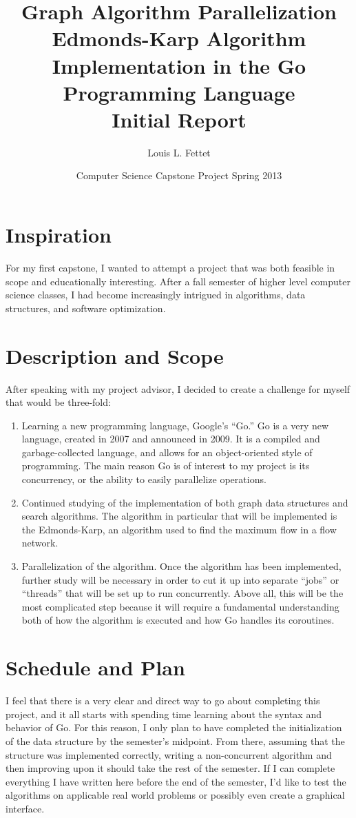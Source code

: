 \documentclass[12pt]{article}
\title{\textbf{Graph Algorithm Parallelization}\\ 
Edmonds-Karp Algorithm Implementation 
in the Go Programming Language\\
Initial Report}
\date{Computer Science Capstone Project Spring 2013}
\author{Louis L. Fettet}
\begin{document}
\maketitle
\section{Inspiration}
For my first capstone, I wanted to attempt a project that was both feasible in scope and educationally interesting.  After a fall semester of higher level computer science classes, I had become increasingly intrigued in algorithms, data structures, and software optimization. 
\section{Description and Scope}
After speaking with my project advisor, I decided to create a challenge for myself that would be three-fold:
	\begin{enumerate}
		\item Learning a new programming language, Google's “Go.” Go is a very new language, created in 2007 and announced in 2009.  It is a compiled and garbage-collected language, and allows for an object-oriented style of programming.  The main reason Go is of interest to my project is its concurrency, or the ability to easily parallelize operations.
		\item Continued studying of the implementation of both graph data structures and search algorithms.  The algorithm in particular that will be implemented is the Edmonds-Karp, an algorithm used to find the maximum flow in a flow network.
		\item Parallelization of the algorithm.  Once the algorithm has been implemented, further study will be necessary in order to cut it up into separate “jobs” or “threads” that will be set up to run concurrently.  Above all, this will be the most complicated step because it will require a fundamental understanding both of how the algorithm is executed and how Go handles its coroutines.
	\end{enumerate}
\section{Schedule and Plan}
I feel that there is a very clear and direct way to go about completing this project, and it all starts with spending time learning about the syntax and behavior of Go.  For this reason, I only plan to have completed the initialization of the data structure by the semester's midpoint.  From there, assuming that the structure was implemented correctly, writing a non-concurrent algorithm and then improving upon it should take the rest of the semester.  If I can complete everything I have written here before the end of the semester, I’d like to test the algorithms on applicable real world problems or possibly even create a graphical interface.
\end{document}
